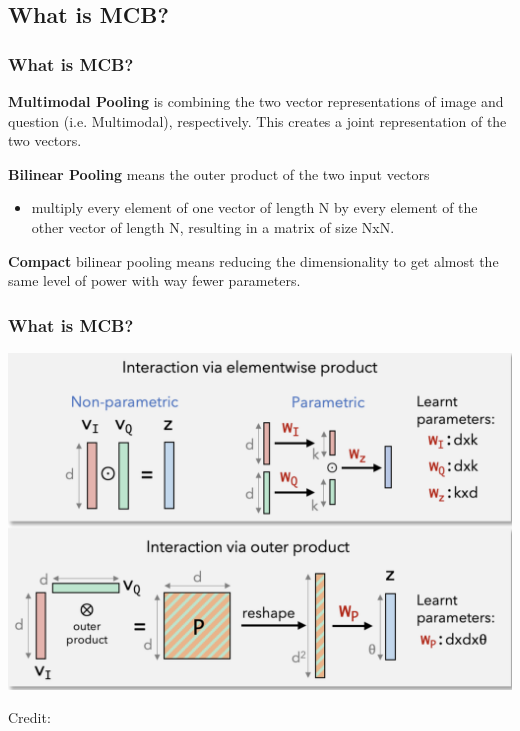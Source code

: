 \documentclass{beamer}
\begin{document}
\subsection{What is MCB?}
\begin{frame}
\frametitle{What is MCB?}
\textbf{Multimodal Pooling} is combining the two vector representations of image and question (i.e. Multimodal), respectively. This creates a joint representation of the two vectors.

\vspace{0.2cm}

\textbf{Bilinear Pooling} means the outer product of the two input vectors
\begin{itemize}
\item multiply every element of one vector of length N by every element of the other vector of length N, resulting in a matrix of size NxN.
\end{itemize}

\vspace{0.2cm}

\textbf{Compact} bilinear pooling means reducing the dimensionality to get almost the same level of power with way fewer parameters.

\end{frame}

\begin{frame}
\frametitle{What is MCB?}
\begin{center}
\includegraphics[scale=0.42]{./images/imfus.png}
\end{center}
\begin{center}
\hspace*{12pt}\hbox{\scriptsize Credit:}
\end{center}
\end{frame}
\end{document}
